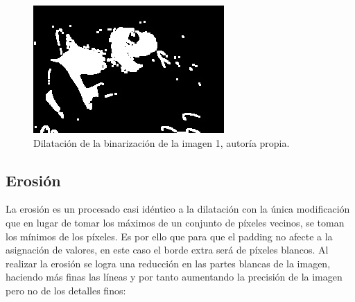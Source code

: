 \documentclass[a4paper,12pt]{article}
\begin{document}
{\begin{figure}[H]
  \centering
  \begin{minipage}[t]{0.4\textwidth}
    \centering
    \includegraphics[width=\textwidth]{processed_data/dilated_0.jpg}
    \caption{Dilatación de la binarización de la imagen 1, autoría propia.}
    \label{fig:dilated}

  \end{minipage}
\end{figure}

\vspace{0.5cm}

\subsection{Erosión}

\vspace{0.5cm}

La erosión es un procesado casi idéntico a la dilatación con la única modificación que en lugar de tomar los máximos de un conjunto de píxeles vecinos, se toman los mínimos de los píxeles.
Es por ello que para que el padding no afecte a la asignación de valores, en este caso el borde extra será de píxeles blancos. Al realizar la erosión se logra una reducción en las partes blancas
de la imagen, haciendo más finas las líneas y por tanto aumentando la precisión de la imagen pero no de los detalles finos:

\vspace{0.5cm}

}
\end{document}
